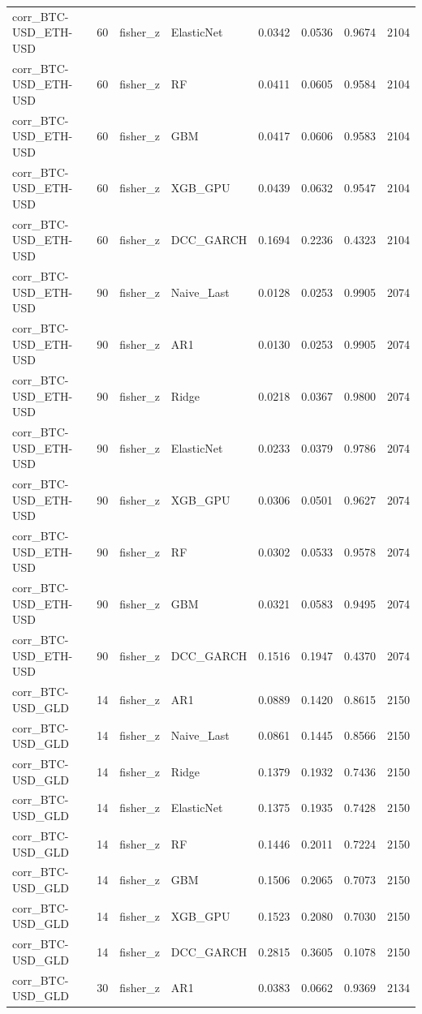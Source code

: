 \begin{table}[H]
\begin{tabular}{llllrrrr}
corr_BTC-USD_ETH-USD & 60 & fisher_z & ElasticNet & 0.0342 & 0.0536 & 0.9674 & 2104 \\
corr_BTC-USD_ETH-USD & 60 & fisher_z & RF & 0.0411 & 0.0605 & 0.9584 & 2104 \\
corr_BTC-USD_ETH-USD & 60 & fisher_z & GBM & 0.0417 & 0.0606 & 0.9583 & 2104 \\
corr_BTC-USD_ETH-USD & 60 & fisher_z & XGB_GPU & 0.0439 & 0.0632 & 0.9547 & 2104 \\
corr_BTC-USD_ETH-USD & 60 & fisher_z & DCC_GARCH & 0.1694 & 0.2236 & 0.4323 & 2104 \\
corr_BTC-USD_ETH-USD & 90 & fisher_z & Naive_Last & 0.0128 & 0.0253 & 0.9905 & 2074 \\
corr_BTC-USD_ETH-USD & 90 & fisher_z & AR1 & 0.0130 & 0.0253 & 0.9905 & 2074 \\
corr_BTC-USD_ETH-USD & 90 & fisher_z & Ridge & 0.0218 & 0.0367 & 0.9800 & 2074 \\
corr_BTC-USD_ETH-USD & 90 & fisher_z & ElasticNet & 0.0233 & 0.0379 & 0.9786 & 2074 \\
corr_BTC-USD_ETH-USD & 90 & fisher_z & XGB_GPU & 0.0306 & 0.0501 & 0.9627 & 2074 \\
corr_BTC-USD_ETH-USD & 90 & fisher_z & RF & 0.0302 & 0.0533 & 0.9578 & 2074 \\
corr_BTC-USD_ETH-USD & 90 & fisher_z & GBM & 0.0321 & 0.0583 & 0.9495 & 2074 \\
corr_BTC-USD_ETH-USD & 90 & fisher_z & DCC_GARCH & 0.1516 & 0.1947 & 0.4370 & 2074 \\
corr_BTC-USD_GLD & 14 & fisher_z & AR1 & 0.0889 & 0.1420 & 0.8615 & 2150 \\
corr_BTC-USD_GLD & 14 & fisher_z & Naive_Last & 0.0861 & 0.1445 & 0.8566 & 2150 \\
corr_BTC-USD_GLD & 14 & fisher_z & Ridge & 0.1379 & 0.1932 & 0.7436 & 2150 \\
corr_BTC-USD_GLD & 14 & fisher_z & ElasticNet & 0.1375 & 0.1935 & 0.7428 & 2150 \\
corr_BTC-USD_GLD & 14 & fisher_z & RF & 0.1446 & 0.2011 & 0.7224 & 2150 \\
corr_BTC-USD_GLD & 14 & fisher_z & GBM & 0.1506 & 0.2065 & 0.7073 & 2150 \\
corr_BTC-USD_GLD & 14 & fisher_z & XGB_GPU & 0.1523 & 0.2080 & 0.7030 & 2150 \\
corr_BTC-USD_GLD & 14 & fisher_z & DCC_GARCH & 0.2815 & 0.3605 & 0.1078 & 2150 \\
corr_BTC-USD_GLD & 30 & fisher_z & AR1 & 0.0383 & 0.0662 & 0.9369 & 2134 \\

\end{tabular}
\end{table}
